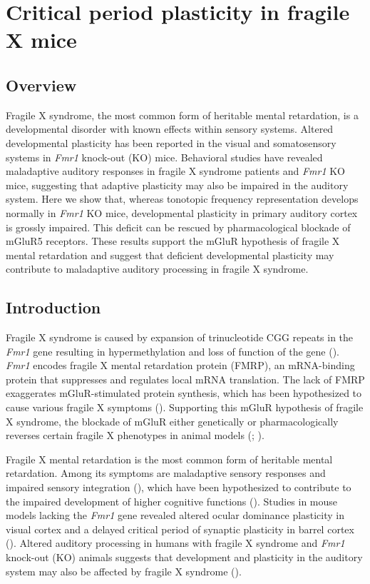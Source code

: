 \chapter{Critical period plasticity in fragile X mice}

\section{Overview}
\newrefsection

Fragile X syndrome, the most common form of heritable mental retardation, is a developmental disorder with known effects within sensory systems. Altered developmental plasticity has been reported in the visual and somatosensory systems in \textit{Fmr1} knock-out (KO) mice. Behavioral studies have revealed maladaptive auditory responses in fragile X syndrome patients and \textit{Fmr1} KO mice, suggesting that adaptive plasticity may also be impaired in the auditory system. Here we show that, whereas tonotopic frequency representation develops normally in \textit{Fmr1} KO mice, developmental plasticity in primary auditory cortex is grossly impaired. This deficit can be rescued by pharmacological blockade of mGluR5 receptors. These results support the mGluR hypothesis of fragile X mental retardation and suggest that deficient developmental plasticity may contribute to maladaptive auditory processing in fragile X syndrome.

\section{Introduction}

Fragile X syndrome is caused by expansion of trinucleotide CGG repeats in the \textit{Fmr1} gene resulting in hypermethylation and loss of function of the gene (\cite{Jin2003}). \textit{Fmr1} encodes fragile X mental retardation protein (FMRP), an mRNA-binding protein that suppresses and regulates local mRNA translation. The lack of FMRP exaggerates mGluR-stimulated protein synthesis, which has been hypothesized to cause various fragile X symptoms (\cite{Bear2004, Osterweil2010}). Supporting this mGluR hypothesis of fragile X syndrome, the blockade of mGluR either genetically or pharmacologically reverses certain fragile X phenotypes in animal models (\cite{McBride2005, Yan2005, Dolen2007}; \cite{DeVrij2008, Meredith2011, Su2011, Michalon2012, Thomas2012}).

Fragile X mental retardation is the most common form of heritable mental retardation. Among its symptoms are maladaptive sensory responses and impaired sensory integration (\cite{Miller1999, Chen2001, Nielsen2002}), which have been hypothesized to contribute to the impaired development of higher cognitive functions (\cite{Hanson1986, Leblanc2011}). Studies in mouse models lacking the \textit{Fmr1} gene revealed altered ocular dominance plasticity in visual cortex and a delayed critical period of synaptic plasticity in barrel cortex (\cite{Dolen2007, Harlow2010}). Altered auditory processing in humans with fragile X syndrome and \textit{Fmr1} knock-out (KO) animals suggests that development and plasticity in the auditory system may also be affected by fragile X syndrome (\cite{Miller1999, Chen2001, Nielsen2002}).

